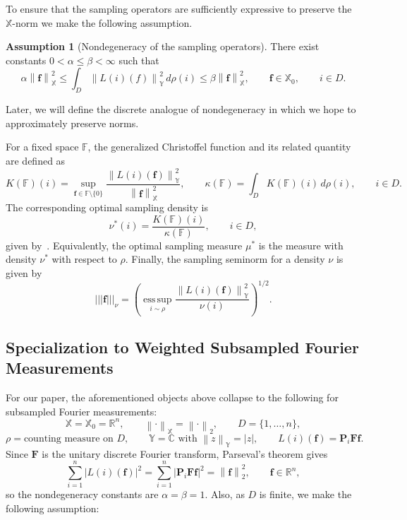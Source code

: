 \documentclass{article}
\theoremstyle{plain}
\theoremstyle{definition}
\newtheorem{assumption}[theorem]{Assumption}
\theoremstyle{remark}
\newcommand*{\snorm}[2]{\left\vert\!\left\vert\!\left\vert #1 \right\vert\!\right\vert\!\right\vert_{#2}}
\begin{document}
To ensure that the sampling operators are sufficiently expressive to preserve the $\mathbb{X}$-norm we make the following assumption.

\begin{assumption}[Nondegeneracy of the sampling operators]
    There exist constants $0<\alpha\leq \beta<\infty$ such that
    \[
      \alpha\left\|\mathbf{f}\right\|_{\mathbb{X}}^2
      \leq
      \int_{D}
      \left\|L(i)(f)\right\|_{\mathbb{Y}}^2
      \, d\rho(i)
      \leq
      \beta\left\|\mathbf{f}\right\|_{\mathbb{X}}^2,
      \qquad
      \mathbf{f}\in\mathbb{X}_0,
      \qquad 
      i \in D.
    \]
\end{assumption}
Later, we will define the discrete analogue of nondegeneracy in which we hope to approximately preserve norms.

For a fixed space $\mathbb{F}$, the generalized Christoffel function and its related quantity are defined as
\[
  K(\mathbb{F})(i)
  =
  \sup_{\mathbf{f}\in \mathbb{F}\setminus\{0\}}
  \frac{\left\|L(i)(\mathbf{f})\right\|_{\mathbb{Y}}^2}
       {\left\|\mathbf{f}\right\|_{\mathbb{X}}^2},
  \qquad
  \kappa(\mathbb{F})
  =
  \int_{D} K(\mathbb{F})(i)\, d\rho(i),
  \qquad 
  i \in D.
\]
The corresponding optimal sampling density is
\[
  \nu^*(i)
  =
  \frac{K(\mathbb{F})(i)}{\kappa(\mathbb{F})},
  \qquad 
  i \in D,
\]
 given by~\cite[Lemma~4.6]{adcock2023cs4ml}. Equivalently, the optimal sampling measure $\mu^*$ is the measure with density $\nu^*$ with respect to $\rho$. Finally, the sampling seminorm for a density $\nu$ is given by
\[
  \snorm{\mathbf{f}}{\nu}
  =
  \left(
    \operatorname*{ess\,sup}_{i \sim \rho}
    \frac{\left\|L(i)(\mathbf{f})\right\|_{\mathbb{Y}}^2}{\nu(i)}
  \right)^{1/2}.
\]

\subsection{Specialization to Weighted Subsampled Fourier Measurements}

For our paper, the aforementioned objects above collapse to the following for subsampled Fourier measurements:
\[
  \mathbb{X}=\mathbb{X}_0=\mathbb{R}^n,
  \qquad
  \left\|\cdot\right\|_{\mathbb{X}}=\left\|\cdot\right\|_2,
  \qquad
  D=\{1,\dots,n\},
\]
\[
  \rho=\text{counting measure on }D,
  \qquad
  \mathbb{Y}=\mathbb{C}
  \text{ with }
  \left\|z\right\|_{\mathbb{Y}}=|z|,
  \qquad
  L(i)(\mathbf f)=\mathbf P_i\mathbf F\mathbf f.
\]
Since $\mathbf{F}$ is the unitary discrete Fourier transform, Parseval's theorem gives
\[
  \sum_{i=1}^n |L(i)(\mathbf f)|^2
  =
  \sum_{i=1}^n \left|\mathbf P_i\mathbf F\mathbf f\right|^2
  =
  \left\|\mathbf f\right\|_2^2,
  \qquad
  \mathbf f\in\mathbb{R}^n,
\]
so the nondegeneracy constants are $\alpha=\beta=1$. Also, as $D$ is finite, we make the following assumption:
\end{document}
